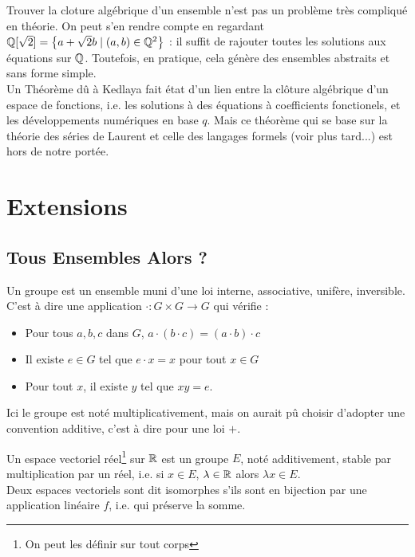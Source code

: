 \documentclass{cours}
\begin{document}
    Trouver la cloture algébrique d'un ensemble n'est pas un problème très compliqué en théorie.  On peut s'en rendre compte en regardant $\mathbb{Q}[\sqrt{2}] = \left\{a + \sqrt{2}b \mid (a, b) \in \mathbb{Q}^{2}\right\}$ : il suffit de rajouter toutes les solutions aux équations sur $\mathbb{Q}$. Toutefois, en pratique, cela génère des ensembles abstraits et sans forme simple.\\

    Un Théorème dû à Kedlaya fait état d'un lien entre la clôture algébrique d'un espace de fonctions, i.e. les solutions à des équations à coefficients fonctionels, et les développements numériques en base $q$. Mais ce théorème qui se base sur la théorie des séries de Laurent et celle des langages formels (voir plus tard...) est hors de notre portée.

    \section{Extensions}
    \subsection{Tous Ensembles Alors ?}
    \begin{definition}
        Un groupe est un ensemble muni d'une loi interne, associative, unifère, inversible. C'est à dire une application $\cdot : G \times G \rightarrow G$ qui vérifie : 
    \begin{itemize}
        \item Pour tous $a, b, c$ dans $G$, $a \cdot (b \cdot c) = (a\cdot b) \cdot c$
        \item Il existe $e \in G$ tel que $e \cdot x = x$ pour tout $x \in G$
        \item Pour tout $x$, il existe $y$ tel que $xy = e$.
    \end{itemize}
    Ici le groupe est noté multiplicativement, mais on aurait pû choisir d'adopter une convention additive, c'est à dire pour une loi $+$.
    \end{definition}

    \begin{definition}
        Un espace vectoriel réel\footnote{On peut les définir sur tout corps} sur $\mathbb{R}$ est un groupe $E$, noté additivement, stable par multiplication par un réel, i.e. si $x \in E$, $\lambda \in \mathbb{R}$ alors $\lambda x \in E$. \\
        Deux espaces vectoriels sont dit isomorphes s'ils sont en bijection par une application linéaire $f$, i.e. qui préserve la somme.
    \end{definition}
\end{document}
